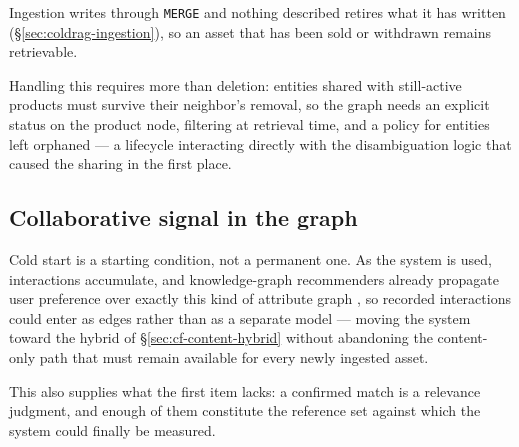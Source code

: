 Ingestion writes through \texttt{MERGE} and nothing described retires what it has written (\S\ref{sec:coldrag-ingestion}), so an asset that has been sold or withdrawn remains retrievable. 

\vspace{0.3cm}

Handling this requires more than deletion: entities shared with still-active products must survive their neighbor's removal, so the graph needs an explicit status on the product node, filtering at retrieval time, and a policy for entities left orphaned — a lifecycle interacting directly with the disambiguation logic that caused the sharing in the first place.

\subsection{Collaborative signal in the graph}

Cold start is a starting condition, not a permanent one. As the system is used, interactions accumulate, and knowledge-graph recommenders already propagate user preference over exactly this kind of attribute graph \citep{wang2019kgat,guo2022survey}, so recorded interactions could enter as edges rather than as a separate model — moving the system toward the hybrid of \S\ref{sec:cf-content-hybrid} \citep{burke2002hybrid} without abandoning the content-only path that must remain available for every newly ingested asset. 

\vspace{0.3cm}

This also supplies what the first item lacks: a confirmed match is a relevance judgment, and enough of them constitute the reference set against which the system could finally be measured.
